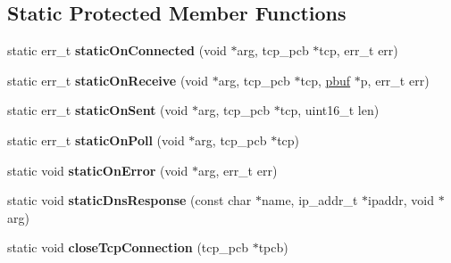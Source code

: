 \subsection*{Static Protected Member Functions}
\begin{DoxyCompactItemize}
\item 
\hypertarget{class_tcp_connection_a2a4cb57a5feac6564230e207e9be583c}{}static err\+\_\+t {\bfseries static\+On\+Connected} (void $\ast$arg, tcp\+\_\+pcb $\ast$tcp, err\+\_\+t err)\label{class_tcp_connection_a2a4cb57a5feac6564230e207e9be583c}

\item 
\hypertarget{class_tcp_connection_a9a344b6bfd607d2c1b0131ef54e8f195}{}static err\+\_\+t {\bfseries static\+On\+Receive} (void $\ast$arg, tcp\+\_\+pcb $\ast$tcp, \hyperlink{structpbuf}{pbuf} $\ast$p, err\+\_\+t err)\label{class_tcp_connection_a9a344b6bfd607d2c1b0131ef54e8f195}

\item 
\hypertarget{class_tcp_connection_a49253c84f376a53a2b4bb74eb66b2e63}{}static err\+\_\+t {\bfseries static\+On\+Sent} (void $\ast$arg, tcp\+\_\+pcb $\ast$tcp, uint16\+\_\+t len)\label{class_tcp_connection_a49253c84f376a53a2b4bb74eb66b2e63}

\item 
\hypertarget{class_tcp_connection_a09675b3f46fd12a8de765f74fb5ccb0a}{}static err\+\_\+t {\bfseries static\+On\+Poll} (void $\ast$arg, tcp\+\_\+pcb $\ast$tcp)\label{class_tcp_connection_a09675b3f46fd12a8de765f74fb5ccb0a}

\item 
\hypertarget{class_tcp_connection_ac50d90859ccd3209640f9acfd0834b0b}{}static void {\bfseries static\+On\+Error} (void $\ast$arg, err\+\_\+t err)\label{class_tcp_connection_ac50d90859ccd3209640f9acfd0834b0b}

\item 
\hypertarget{class_tcp_connection_a92583d25ced7b447e9dd871da15d4644}{}static void {\bfseries static\+Dns\+Response} (const char $\ast$name, ip\+\_\+addr\+\_\+t $\ast$ipaddr, void $\ast$arg)\label{class_tcp_connection_a92583d25ced7b447e9dd871da15d4644}

\item 
\hypertarget{class_tcp_connection_a4a4fa5228dc736531c7eea389f6523b7}{}static void {\bfseries close\+Tcp\+Connection} (tcp\+\_\+pcb $\ast$tpcb)\label{class_tcp_connection_a4a4fa5228dc736531c7eea389f6523b7}

\end{DoxyCompactItemize}
